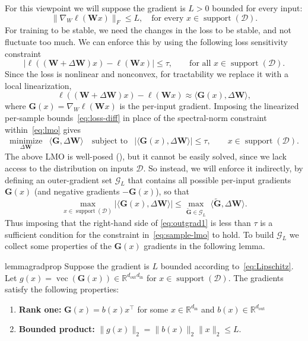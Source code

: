 \documentclass[11pt]{article}
\DeclareMathOperator{\support}{support}
\renewcommand{\vec}{\operatorname{vec}}
\newcommand{\mat}[1]{\bm{#1}}
\newcommand{\cD}{\mathcal{D}}
\newcommand{\R}{\mathbb{R}}
\newcommand{\ip}[1]{\langle #1 \rangle}
\begin{document}
For this viewpoint we will suppose the gradient is $L>0$ bounded for every input:
\begin{equation} \label{eq:Lipschitz}
    \| \nabla_W \ell(\mat{W}x) \|_F \leq L, \quad \mbox{for every } x \in \support(\cD).
\end{equation} 
For training to be stable, we need the changes in the loss to be stable, and not fluctuate too much. We can enforce this by using the following loss sensitivity constraint
\begin{equation}\label{eq:loss-diff}
     |\ell((\mat{W} +\Delta\mat{W})x) - \ell (\mat{W}x)|\leq \tau, \qquad \mbox{for all } x \in \support(\cD).
\end{equation} 
Since the loss is nonlinear and nonconvex, for tractability we replace it with a local linearization,
\[  
\ell((\mat{W} +\Delta\mat{W})x) -\ell (\mat{W}x)  \approx \ip{\mat{G}(x), \Delta\mat{W}},
\]
where $\mat{G}(x) = \nabla_W \ell(\mat{W}x)$ is the per-input gradient. 
Imposing the linearized per-sample bounds~\eqref{eq:loss-diff} in place of the spectral-norm constraint within~\eqref{eq:lmo} gives
\begin{equation}
 \begin{array}{lll}
  \underset{\Delta\mat{W}}{\mathrm{minimize}} &
  \ip{\mat{G}, \Delta\mat{W}}  \quad 
  \mbox{subject to} &
  \displaystyle  
|\ip{\mat{G}(x), \Delta\mat{W}}|
  \le \tau, \qquad x \in \support(\cD).
  \end{array}
  \label{eq:sample-lmo}
\end{equation}
The above LMO is well-posed (), but it cannot be easily solved, since we lack access to the distribution on inputs $\cD$.
So instead, we will enforce it indirectly, by defining an outer-gradient set $\mathcal{G}_L$ that contains all possible per-input gradients $\mat{G}(x)$ (and negative gradients $-\mat{G}(x)$), so that
\begin{equation} \label{eq:outgrad1}
    \max_{x \in \support(\cD)}  |\ip{\mat{G}(x), \Delta\mat{W}}|
    \leq   \max_{\widetilde{\mat{G}} \in \mathcal{G}_L} \; \ip{\widetilde{\mat{G}}, \Delta\mat{W}}.
\end{equation}
Thus imposing that the right-hand side of \eqref{eq:outgrad1}
is less than $\tau$ is a sufficient condition for the constraint in~\eqref{eq:sample-lmo} to hold.
To build $\mathcal{G}_L$ we collect some  properties of the $\mat{G}(x)$ gradients in the following lemma.
\begin{restatable}{lemma}{gradprop} 
  \label{lem:gradprop} Suppose the gradient is $L$ bounded according to~\eqref{eq:Lipschitz}. 
    Let $g(x)=\vec(\mat{G}(x)) \in \R^{d_{\mathrm{out}} d_{\mathrm{in}}}$ for $x \in \support(\cD)$.  The gradients satisfy the following properties:
    \begin{enumerate}
        \item {\bf Rank one:} $\mat{G}(x) = b(x) x^\top$  for some $x \in \R^{d_{\mathrm{in}}}$ and $b(x) \in \R^{d_{\mathrm{out}}}$
        \item {\bf Bounded product:} $\| g(x)\|_2 = \|b(x)\|_2  \|x\|_2\leq L. $
        \end{enumerate}
\end{restatable}
\end{document}
